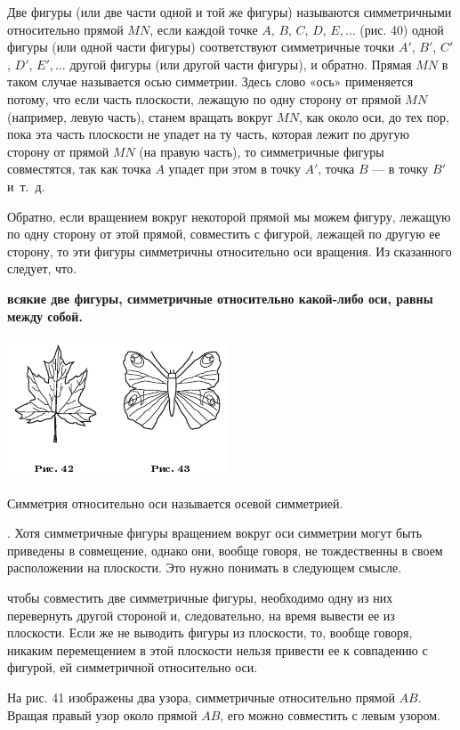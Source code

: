 \documentclass[oneside]{book}
\begin{document}
Две фигуры (или две части одной и той же фигуры) называются симметричными относительно прямой $MN$, если каждой точке $A$, $B$, $C$, $D$, $E,\dots$
(рис. 40) одной фигуры (или одной части фигуры) соответствуют симметричные точки $A'$, $B'$, $C'$, $D'$, $E',\dots$ другой фигуры (или другой части фигуры), и обратно.
Прямая $MN$ в таком случае называется осью симметрии.
Здесь слово «ось» применяется потому, что если часть плоскости, лежащую по одну сторону от прямой $MN$ (например, левую часть), станем вращать вокруг $MN$, как около оси, до тех пор, пока эта часть плоскости не упадет на ту часть, которая лежит по другую сторону от прямой $MN$ (на правую часть), то симметричные фигуры совместятся, так как точка $A$ упадет при этом в точку $A'$, точка $B$ — в точку $B'$ и~т.~д.

Обратно, если вращением вокруг некоторой прямой мы можем фигуру, лежащую по одну сторону от этой прямой, совместить с фигурой, лежащей по другую ее сторону, то эти фигуры симметричны относительно оси вращения.
Из сказанного следует, что.

\textbf{всякие две фигуры, симметричные относительно какой-либо оси, равны между собой.}

\includegraphics{pics/ris-42-43}

Симметрия относительно оси называется осевой симметрией.

.
Хотя симметричные фигуры вращением вокруг оси симметрии могут быть приведены в совмещение, однако они, вообще говоря, не тождественны в своем расположении на плоскости.
Это нужно понимать в следующем смысле.

чтобы совместить две симметричные фигуры, необходимо одну из них перевернуть другой стороной и, следовательно, на время вывести ее из плоскости.
Если же не выводить фигуры из плоскости, то, вообще говоря, никаким перемещением в этой плоскости нельзя привести ее к совпадению с фигурой, ей симметричной относительно оси.

На рис. 41 изображены два узора, симметричные относительно прямой $AB$.
Вращая правый узор около прямой $AB$, его можно совместить с левым узором.
\end{document}
